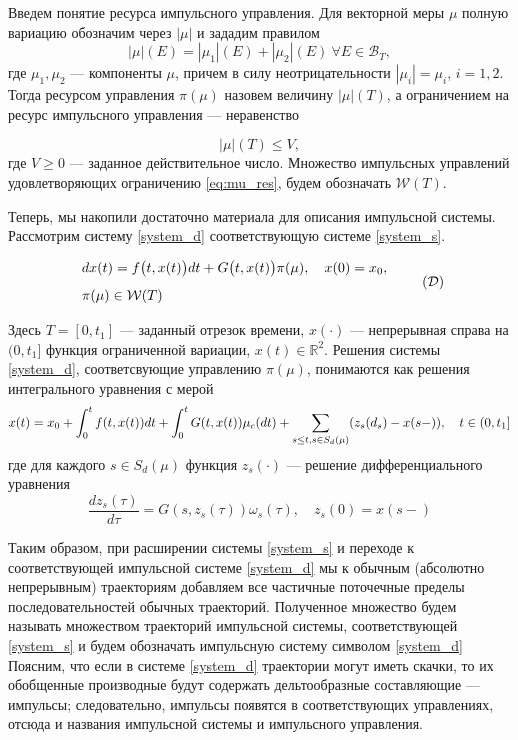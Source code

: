 Введем понятие ресурса импульсного управления. Для векторной меры
$\mu$ полную вариацию обозначим через $|\mu|$ и зададим правилом
\begin{equation*}
  |\mu|(E) = |\mu_1|(E) + |\mu_2|(E) \ \forall E \in \mathcal{B}_T,
\end{equation*}
где $\mu_1,\mu_2$ --- компоненты $\mu$, причем в силу
неотрицательности $|\mu_i| = \mu_i$, $i=1,2$. Тогда ресурсом
управления $\pi(\mu)$ назовем величину $|\mu|(T)$, а ограничением на
ресурс импульсного управления --- неравенство

\begin{equation}
  \label{eq:mu_res}
  |\mu|(T) \le V,
\end{equation}
где $V \ge 0$ --- заданное действительное число. Множество импульсных
управлений удовлетворяющих ограничению \eqref{eq:mu_res}, будем
обозначать $\mathcal{W}(T)$.


Теперь, мы накопили достаточно материала для описания импульсной
системы. Рассмотрим систему \eqref{system_d} соответствующую системе
\eqref{system_s}.

\begin{equation}
  \label{system_d}
  \begin{array}{l}
    dx(t)=f\big(t,x(t)\big)dt+G\big(t,x(t)\big)\pi(\mu), \quad
    x(0)=x_0, \\[8pt]
    \pi(\mu) \in \mathcal{W}(T)
  \end{array} \tag{$\mathcal{D}$}
\end{equation}

Здесь $T=[0,t_1]$ --- заданный отрезок времени, $x(\cdot)$ ---
непрерывная справа на $(0,t_1]$ функция ограниченной вариации, $x(t)
\in \mathbb{R}^2$. Решения системы \eqref{system_d}, соответсвующие
управлению $\pi(\mu)$, понимаются как решения интегрального уравнения
с мерой
\begin{equation*}
  x(t) = x_0 + \int_0^t f(t,x(t))dt + \int_0^t G(t,x(t)) \mu_c(dt) +
  \sum_{s \le t,\\s \in S_d(\mu)} (z_s(d_s) - x(s-)), \quad t \in (0,t_1]
\end{equation*}
где для каждого $s \in S_d(\mu)$ функция $z_s(\cdot)$ --- решение
дифференциального уравнения
\begin{equation*}
  \frac{dz_s(\tau)}{d\tau} = G(s,z_s(\tau))\omega_s(\tau), \quad z_s(0)=x(s-)
\end{equation*}

Таким образом, при расширении системы \eqref{system_s} и переходе к
соответствующей импульсной системе \eqref{system_d} мы к обычным
(абсолютно непрерывным) траекториям добавляем все частичные
поточечные пределы последовательностей обычных
траекторий. Полученное множество будем называть множеством
траекторий импульсной системы, соответствующей \eqref{system_s} и будем
обозначать импульсную систему символом \eqref{system_d} Поясним,
что если в системе \eqref{system_d} траектории могут иметь скачки,
то их обобщенные производные будут содержать дельтообразные
составляющие --- импульсы; следовательно, импульсы появятся в
соответствующих управлениях, отсюда и названия импульсной системы и
импульсного управления.

